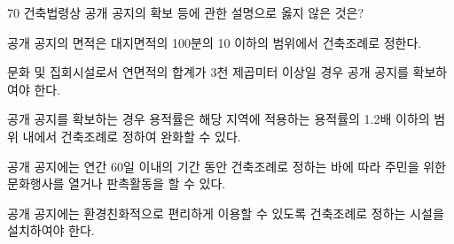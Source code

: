 \begin{question}{70}
건축법령상 공개 공지의 확보 등에 관한 설명으로 옳지 않은 것은?
\begin{choices}
  \item 공개 공지의 면적은 대지면적의 100분의 10 이하의 범위에서 건축조례로 정한다.
  \item 문화 및 집회시설로서 연면적의 합계가 3천 제곱미터 이상일 경우 공개 공지를 확보하여야 한다.
  \item 공개 공지를 확보하는 경우 용적률은 해당 지역에 적용하는 용적률의 1.2배 이하의 범위 내에서 건축조례로 정하여 완화할 수 있다.
  \item 공개 공지에는 연간 60일 이내의 기간 동안 건축조례로 정하는 바에 따라 주민을 위한 문화행사를 열거나 판촉활동을 할 수 있다.
  \item 공개 공지에는 환경친화적으로 편리하게 이용할 수 있도록 건축조례로 정하는 시설을 설치하여야 한다.
\end{choices}
\end{question}
